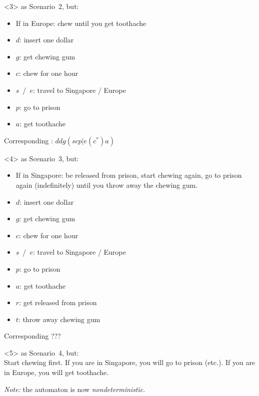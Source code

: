 \documentclass{beamer}
\begin{document}
\begin{frame}[fragile]
  \begin{onlyenv}<3>
     as Scenario~2, but:
    \begin{itemize}
    \item If in Europe: chew until you get toothache
    \end{itemize}


    \begin{itemize}
    \item $d$: insert one dollar
    \item $g$: get chewing gum
    \item $c$: chew for one hour
    \item $s$~/~$e$: travel to Singapore / Europe
    \item $p$: go to prison
    \item $a$: get toothache
    \end{itemize}

    Corresponding : $ddg(scp|e(c^*)a)$
  \end{onlyenv}


  
  \begin{onlyenv}<4>
     as Scenario~3, but:
    \begin{itemize}
    \item If in Singapore: be released from prison, start chewing again, go to prison again (indefinitely) until you throw away the chewing gum. 
    \end{itemize}


    \begin{itemize}
    \item $d$: insert one dollar
    \item $g$: get chewing gum
    \item $c$: chew for one hour
    \item $s$~/~$e$: travel to Singapore / Europe
    \item $p$: go to prison
    \item $a$: get toothache
    \item $r$: get released from prison
    \item $t$: throw away chewing gum
    \end{itemize}

    Corresponding  ???
  \end{onlyenv}


  
  \begin{onlyenv}<5>
     as Scenario~4, but:\\
    Start chewing first. If you are in Singapore, you will go to prison (etc.). If you are in Europe, you will get toothache.

    \emph{Note:} the automaton is now \emph{nondeterministic}.
  \end{onlyenv}
  
    
\end{frame}
\end{document}

